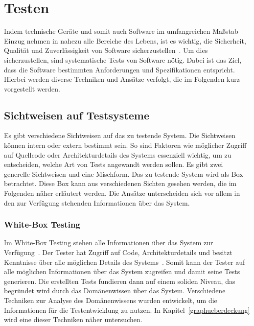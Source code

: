 \newpage
\section{Testen}
\label{test}

Indem technische Geräte und somit auch Software im umfangreichen Maßstab Einzug nehmen in nahezu alle Bereiche des
Lebens, ist es wichtig, die Sicherheit, Qualität und Zuverlässigkeit von Software sicherzustellen~\cite[vgl. Introduction]{software-testing}.
Um dies sicherzustellen, sind systematische Tests von Software nötig.
Dabei ist das Ziel, dass die Software bestimmten Anforderungen und Spezifikationen entspricht.
Hierbei werden diverse Techniken und Ansätze verfolgt, die im Folgenden kurz vorgestellt werden.

\subsection{Sichtweisen auf Testsysteme}

Es gibt verschiedene Sichtweisen auf das zu testende System.
Die Sichtweisen können intern oder extern bestimmt sein.
So sind Faktoren wie möglicher Zugriff auf Quellcode oder Architekturdetails des Systems essenziell wichtig, um zu entscheiden, welche Art von Tests angewandt werden sollen.
Es gibt zwei generelle Sichtweisen und eine Mischform.
Das zu testende System wird als Box betrachtet.
Diese Box kann aus verschiedenen Sichten gesehen werden, die im Folgenden näher erläutert werden.
Die Ansätze unterscheiden sich vor allem in den zur Verfügung stehenden Informationen über das System.

\subsubsection{White-Box Testing}

Im White-Box Testing stehen alle Informationen über das System zur Verfügung~\cite[vgl. 1.4.2 Code-Based Testing]{software-testing-craftmans}.
Der Tester hat Zugriff auf Code, Architekturdetails und besitzt Kenntnisse über alle möglichen Details des Systems~\cite[vgl. 1.4.2 Code-Based Testing]{software-testing-craftmans}.
Somit kann der Tester auf alle möglichen Informationen über das System zugreifen und damit seine Tests generieren.
Die erstellten Tests fundieren dann auf einem soliden Niveau, das begründet wird durch das Domänenwissen über das System.
Verschiedene Techniken zur Analyse des Domänenwissens wurden entwickelt, um die Informationen für die Testentwicklung zu nutzen.
In Kapitel~\ref{graphueberdeckung} wird eine dieser Techniken näher untersuchen.


